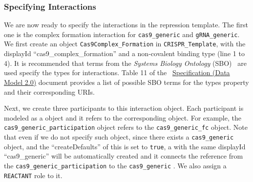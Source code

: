 \subsubsection*{Specifying Interactions}
We are now ready to specify the interactions in the repression template. The first one is the complex formation interaction for \lstinline+cas9_generic+ and \lstinline+gRNA_generic+. We first create an  object \lstinline+Cas9Complex_Formation+ in \lstinline+CRISPR_Template+, with the displayId ``cas9\_complex\_formation'' and a non-covalent binding type (line 1 to 4). It is recommended that terms from the \emph{Systems Biology Ontology} (SBO)~\cite{Courtot2011} are used specify the types for interactions. Table 11 of the ~\href{http://sbolstandard.org/downloads/specification-data-model-2-0/}{Specification  (Data Model 2.0)} document provides a list of possible SBO terms for the types property and their corresponding URIs. 

Next, we create three participants to this interaction object. Each participant is modeled as a  object and it refers to the corresponding  object. For example, the \lstinline+cas9_generic_participation+  object refers to the \lstinline+cas9_generic_fc+  object. Note that even if we do not specify such object, since there exists a \lstinline+cas9_generic+  object, and the ``createDefaults'' of this  is set to \lstinline+true+, a  with the same displayId ``cas9\_generic'' will be automatically created and it connects the reference from the \lstinline+cas9_generic_participation+  to the \lstinline+cas9_generic+ . We also assign a \lstinline+REACTANT+ role to it.

